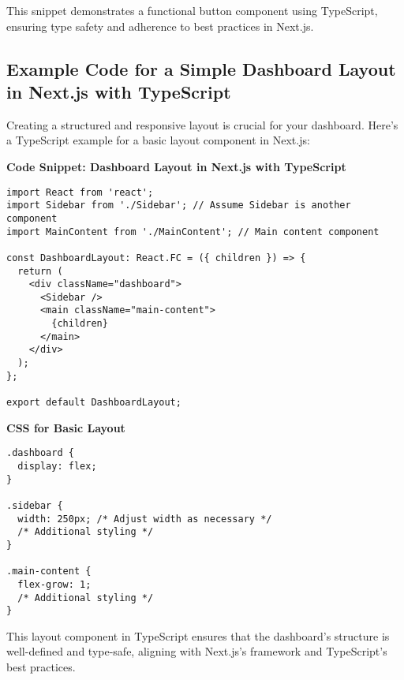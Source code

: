 This snippet demonstrates a functional button component using TypeScript, ensuring type safety and adherence to best practices in Next.js.

\subsection*{Example Code for a Simple Dashboard Layout in Next.js with TypeScript}
Creating a structured and responsive layout is crucial for your dashboard. Here's a TypeScript example for a basic layout component in Next.js:

\textbf{Code Snippet: Dashboard Layout in Next.js with TypeScript}
\begin{verbatim}
import React from 'react';
import Sidebar from './Sidebar'; // Assume Sidebar is another component
import MainContent from './MainContent'; // Main content component

const DashboardLayout: React.FC = ({ children }) => {
  return (
    <div className="dashboard">
      <Sidebar />
      <main className="main-content">
        {children}
      </main>
    </div>
  );
};

export default DashboardLayout;
\end{verbatim}

\textbf{CSS for Basic Layout}
\begin{verbatim}
.dashboard {
  display: flex;
}

.sidebar {
  width: 250px; /* Adjust width as necessary */
  /* Additional styling */
}

.main-content {
  flex-grow: 1;
  /* Additional styling */
}
\end{verbatim}

This layout component in TypeScript ensures that the dashboard's structure is well-defined and type-safe, aligning with Next.js's framework and TypeScript's best practices.

